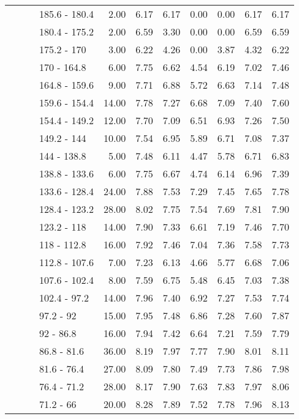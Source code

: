 \begin{longtable}{llllrrrrrrr}
   &  &  & 185.6 - 180.4 & 2.00 & 6.17 & 6.17 & 0.00 & 0.00 & 6.17 & 6.17 \\ 
   &  &  & 180.4 - 175.2 & 2.00 & 6.59 & 3.30 & 0.00 & 0.00 & 6.59 & 6.59 \\ 
   &  &  & 175.2 - 170 & 3.00 & 6.22 & 4.26 & 0.00 & 3.87 & 4.32 & 6.22 \\ 
   &  &  & 170 - 164.8 & 6.00 & 7.75 & 6.62 & 4.54 & 6.19 & 7.02 & 7.46 \\ 
   &  &  & 164.8 - 159.6 & 9.00 & 7.71 & 6.88 & 5.72 & 6.63 & 7.14 & 7.48 \\ 
   &  &  & 159.6 - 154.4 & 14.00 & 7.78 & 7.27 & 6.68 & 7.09 & 7.40 & 7.60 \\ 
   &  &  & 154.4 - 149.2 & 12.00 & 7.70 & 7.09 & 6.51 & 6.93 & 7.26 & 7.50 \\ 
   &  &  & 149.2 - 144 & 10.00 & 7.54 & 6.95 & 5.89 & 6.71 & 7.08 & 7.37 \\ 
   &  &  & 144 - 138.8 & 5.00 & 7.48 & 6.11 & 4.47 & 5.78 & 6.71 & 6.83 \\ 
   &  &  & 138.8 - 133.6 & 6.00 & 7.75 & 6.67 & 4.74 & 6.14 & 6.96 & 7.39 \\ 
   &  &  & 133.6 - 128.4 & 24.00 & 7.88 & 7.53 & 7.29 & 7.45 & 7.65 & 7.78 \\ 
   &  &  & 128.4 - 123.2 & 28.00 & 8.02 & 7.75 & 7.54 & 7.69 & 7.81 & 7.90 \\ 
   &  &  & 123.2 - 118 & 14.00 & 7.90 & 7.33 & 6.61 & 7.19 & 7.46 & 7.70 \\ 
   &  &  & 118 - 112.8 & 16.00 & 7.92 & 7.46 & 7.04 & 7.36 & 7.58 & 7.73 \\ 
   &  &  & 112.8 - 107.6 & 7.00 & 7.23 & 6.13 & 4.66 & 5.77 & 6.68 & 7.06 \\ 
   &  &  & 107.6 - 102.4 & 8.00 & 7.59 & 6.75 & 5.48 & 6.45 & 7.03 & 7.38 \\ 
   &  &  & 102.4 - 97.2 & 14.00 & 7.96 & 7.40 & 6.92 & 7.27 & 7.53 & 7.74 \\ 
   &  &  & 97.2 - 92 & 15.00 & 7.95 & 7.48 & 6.86 & 7.28 & 7.60 & 7.87 \\ 
   &  &  & 92 - 86.8 & 16.00 & 7.94 & 7.42 & 6.64 & 7.21 & 7.59 & 7.79 \\ 
   &  &  & 86.8 - 81.6 & 36.00 & 8.19 & 7.97 & 7.77 & 7.90 & 8.01 & 8.11 \\ 
   &  &  & 81.6 - 76.4 & 27.00 & 8.09 & 7.80 & 7.49 & 7.73 & 7.86 & 7.98 \\ 
   &  &  & 76.4 - 71.2 & 28.00 & 8.17 & 7.90 & 7.63 & 7.83 & 7.97 & 8.06 \\ 
   &  &  & 71.2 - 66 & 20.00 & 8.28 & 7.89 & 7.52 & 7.78 & 7.96 & 8.13 \\ 

\end{longtable}
